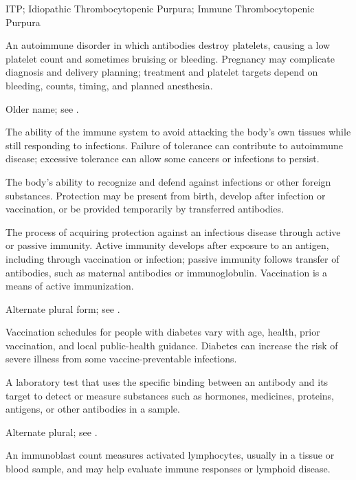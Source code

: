 \synonyms
ITP; Idiopathic Thrombocytopenic Purpura; Immune Thrombocytopenic Purpura

 An autoimmune disorder in which antibodies destroy platelets, causing a low platelet count and sometimes bruising or bleeding. Pregnancy may complicate diagnosis and delivery planning; treatment and platelet targets depend on bleeding, counts, timing, and planned anesthesia.

 Older name; see .

 The ability of the immune system to avoid attacking the body’s own tissues while still responding to infections. Failure of tolerance can contribute to autoimmune disease; excessive tolerance can allow some cancers or infections to persist.

 The body’s ability to recognize and defend against infections or other foreign substances. Protection may be present from birth, develop after infection or vaccination, or be provided temporarily by transferred antibodies.

 The process of acquiring protection against an infectious disease
through active or passive immunity. Active immunity develops after exposure to an antigen,
including through vaccination or infection; passive immunity follows transfer of antibodies,
such as maternal antibodies or immunoglobulin. Vaccination is a means of active immunization.

 Alternate plural form; see .

 Vaccination schedules for people with diabetes vary with age, health, prior vaccination, and local public-health guidance. Diabetes can increase the risk of severe illness from some vaccine-preventable infections.

 A laboratory test that uses the specific binding between an antibody and its target to detect or measure substances such as hormones, medicines, proteins, antigens, or other antibodies in a sample.

 Alternate plural; see .

 An immunoblast count measures activated lymphocytes, usually in a tissue or blood sample, and may help evaluate immune responses or lymphoid disease.

